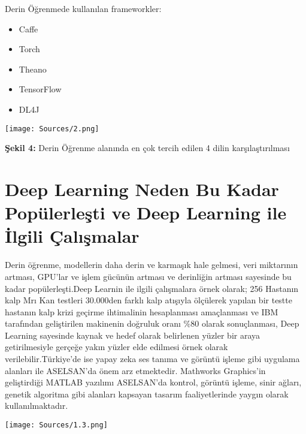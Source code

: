 \documentclass{IEEEtran}
\begin{document}
            \hspace{10}Derin Öğrenmede kullanılan frameworkler:
            
            \begin{itemize}
                \item Caffe
                \item Torch
                \item Theano
                \item TensorFlow
                \item DL4J
            \end{itemize}
    
            \begin{center}
            \hspace{-35pt}   
            \texttt{[image: Sources/2.png]} 
            \end{center}
            \textbf{Şekil 4: }Derin Öğrenme alanında en çok tercih edilen 4 dilin karşılaştırılması
            \vspace{15pt}
   
    
    \section{Deep Learning Neden Bu Kadar Popülerleşti ve Deep Learning ile İlgili Çalışmalar}
        \label{sec:PopulerlesmeNedeni}
            Derin öğrenme, modellerin daha derin ve karmaşık hale gelmesi, veri miktarının artması, GPU'lar ve işlem gücünün artması ve derinliğin artması sayesinde bu kadar popülerleşti.Deep Learnin ile ilgili çalışmalara örnek olarak; 256 Hastanın kalp Mrı Kan testleri 30.000den farklı kalp atışıyla ölçülerek yapılan bir testte hastanın kalp krizi geçirme ihtimalinin hesaplanması amaçlanması ve IBM tarafından geliştirilen makinenin doğruluk oranı \%80 olarak sonuçlanması, Deep Learning sayesinde kaynak ve hedef olarak belirlenen yüzler bir araya getirilmesiyle gerçeğe yakın yüzler elde edilmesi örnek olarak verilebilir.Türkiye'de ise yapay zeka ses tanıma ve görüntü işleme gibi uygulama alanları ile ASELSAN’da önem arz etmektedir. Mathworks Graphics'in geliştirdiği MATLAB yazılımı ASELSAN'da kontrol, görüntü işleme, sinir ağları, genetik algoritma gibi alanları kapsayan tasarım faaliyetlerinde yaygın olarak kullanılmaktadır.

        \begin{center}
            \texttt{[image: Sources/1.3.png]} 
        \end{center}
\end{document}

